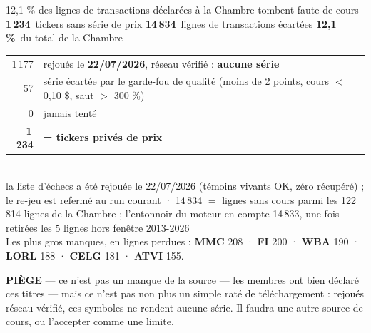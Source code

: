 \documentclass[11pt,aspectratio=169]{beamer}
\newcommand{\kpi}[3]{{\large\textbf{\textcolor{#1}{#2}}}~{\footnotesize #3}}
\newcommand{\defl}[1]{{\scriptsize\color{black!55}#1}}
\newcommand{\piege}[1]{%
  \colorbox{warnorange!12}{\parbox{\dimexpr\linewidth-8pt}{\scriptsize
    \textbf{\textcolor{warnorange}{PIÈGE}}\; --- #1}}}
\begin{document}
\begin{frame}{12,1 \% des lignes de transactions déclarées à la Chambre tombent faute de cours}
  \centering
  \kpi{alertred}{1\,234}{tickers sans série de prix}\quad
  \kpi{alertred}{14\,834}{lignes de transactions écartées}\quad
  \kpi{alertred}{12,1 \%}{du total de la Chambre}\\[3mm]
  {\footnotesize\begin{tabular}{r l}
    \toprule
    1\,177 & rejoués le \textbf{22/07/2026}, réseau vérifié : \textbf{aucune série}\\
    57     & série écartée par le garde-fou de qualité \defl{(moins de 2 points, cours $<$ 0,10 \$, saut $>$ 300 \%)}\\
    0      & jamais tenté\\
    \midrule
    \textbf{1\,234} & \textbf{= tickers privés de prix}\\
    \bottomrule
  \end{tabular}}\\[2mm]
  \defl{la liste d'échecs a été rejouée le 22/07/2026 (témoins vivants OK, zéro récupéré) ; le re-jeu est refermé au run courant · 14\,834 $=$ lignes sans cours
  parmi les 122\,814 lignes de la Chambre ; l'entonnoir du moteur en compte 14\,833, une fois
  retirées les 5 lignes hors fenêtre 2013-2026}\\[2mm]
  {\footnotesize Les plus gros manques, en lignes perdues :
  \textbf{MMC} 208 · \textbf{FI} 200 · \textbf{WBA} 190 · \textbf{LORL} 188 · \textbf{CELG} 181 · \textbf{ATVI} 155.}\\[2mm]
  \piege{ce n'est pas un manque de la source --- les membres ont bien déclaré ces titres --- mais ce n'est pas non plus un simple raté de téléchargement : rejoués réseau vérifié, ces symboles ne rendent aucune série. Il faudra une autre source de cours, ou l'accepter comme une limite.}
\end{frame}
\end{document}
